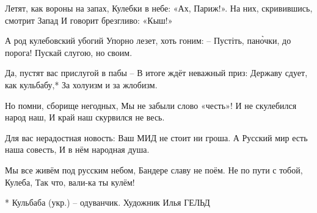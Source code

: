 Летят, как вороны на запах,
Кулебки в небе: «Ах, Париж!».
На них, скривившись, смотрит Запад
И говорит брезгливо: «Кыш!»

А род кулебовский убогий
Упорно лезет, хоть гоним:
– Пустіть, пано̀чки, до порога!
Пускай слугою, но своим.

Да, пустят вас прислугой в пабы – 
В итоге ждёт неважный приз:
Державу сдует, как кульбабу,* 
За холуизм и за жлобизм.

Но помни, сборище негодных,
Мы не забыли слово «честь»!
И не скулебился народ наш,
И край наш скурвился не весь.

Для вас нерадостная новость:
Ваш МИД не стоит ни гроша.
А Русский мир есть наша совесть,
И в нём народная душа.

Мы все живём под русским небом,
Бандере славу не поём.
Не по пути с тобой, Кулеба,
Так что, вали-ка ты кулём!

* Кульбаба (укр.) – одуванчик. 
Художник Илья ГЕЛЬД
